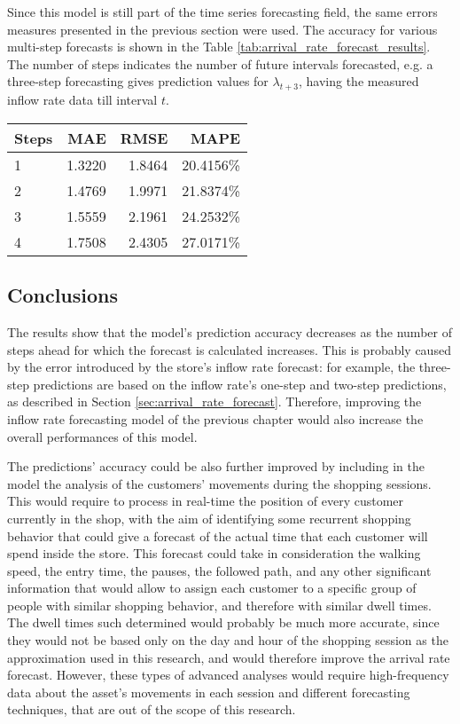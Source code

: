 Since this model is still part of the time series forecasting field, the same errors measures presented in the previous section were used. The accuracy for various multi-step forecasts is shown in the Table \ref{tab:arrival_rate_forecast_results}. The number of steps indicates the number of future intervals forecasted, e.g. a three-step forecasting gives prediction values for \( \lambda_{t+3} \), having the measured inflow rate data till interval \( t \).

\begin{center}
  \begin{tabular}{ l r r r }
    \hline
    Steps & MAE    & RMSE   & MAPE      \\
    \hline
    1     & 1.3220 & 1.8464 & 20.4156\% \\
    2     & 1.4769 & 1.9971 & 21.8374\% \\
    3     & 1.5559 & 2.1961 & 24.2532\% \\
    4     & 1.7508 & 2.4305 & 27.0171\% \\
    \hline
  \end{tabular}
\end{center}

\subsection{Conclusions}
\label{subsec:arrival_rate_forecast_results_conclusions}

The results show that the model’s prediction accuracy decreases as the number of steps ahead for which the forecast is calculated increases. This is probably caused by the error introduced by the store’s inflow rate forecast: for example, the three-step predictions are based on the inflow rate’s one-step and two-step predictions, as described in Section \ref{sec:arrival_rate_forecast}. Therefore, improving the inflow rate forecasting model of the previous chapter would also increase the overall performances of this model.

The predictions’ accuracy could be also further improved by including in the model the analysis of the customers’ movements during the shopping sessions. This would require to process in real-time the position of every customer currently in the shop, with the aim of identifying some recurrent shopping behavior that could give a forecast of the actual time that each customer will spend inside the store. This forecast could take in consideration the walking speed, the entry time, the pauses, the followed path, and any other significant information that would allow to assign each customer to a specific group of people with similar shopping behavior, and therefore with similar dwell times. The dwell times such determined would probably be much more accurate, since they would not be based only on the day and hour of the shopping session as the approximation used in this research, and would therefore improve the arrival rate forecast. However, these types of advanced analyses would require high-frequency data about the asset’s movements in each session and different forecasting techniques, that are out of the scope of this research.

